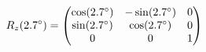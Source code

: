 \documentclass[preview]{standalone}
\begin{document}
\begin{align*}
\special{dvisvgm:raw <g id='unique000'>}R_z(2.7^\circ) = \begin{pmatrix} \cos(2.7^\circ) & -\sin(2.7^\circ) & 0 \\ \sin(2.7^\circ) & \cos(2.7^\circ) & 0 \\ 0 & 0 & 1 \end{pmatrix}\special{dvisvgm:raw </g>}
\end{align*}
\end{document}
